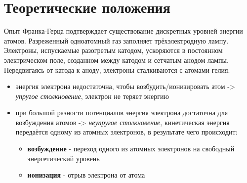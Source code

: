 \documentclass[a4paper, 12pt]{article}
\begin{document}
\section{Теоретические положения}
Опыт Франка-Герца подтверждает существование дискретных уровней энергии атомов. Разреженный одноатомный газ заполняет трёхэлектродную лампу. Электроны, испускаемые разогретым катодом, ускоряются в постоянном электрическом поле, созданном между катодом и сетчатым анодом лампы. Передвигаясь от катода к аноду, электроны сталкиваются с атомами гелия.
\begin{itemize}
    \item энергия электрона недостаточна, чтобы возбудить/ионизировать атом -> \textit{упругое столкновение}, электрон не теряет энергию
    \item при большой разности потенциалов энергия электрона достаточна для возбуждения атомов -> \textit{неупругое столкновение}, кинетическая энергия передаётся одному из атомных электронов, в результате чего происходит:
    \begin{itemize}
        \item \textbf{возбуждение} - переход одного из атомных электронов на свободный энергетический уровень
        \item \textbf{ионизация} - отрыв электрона от атома 
    \end{itemize}
\end{itemize}
\end{document}
